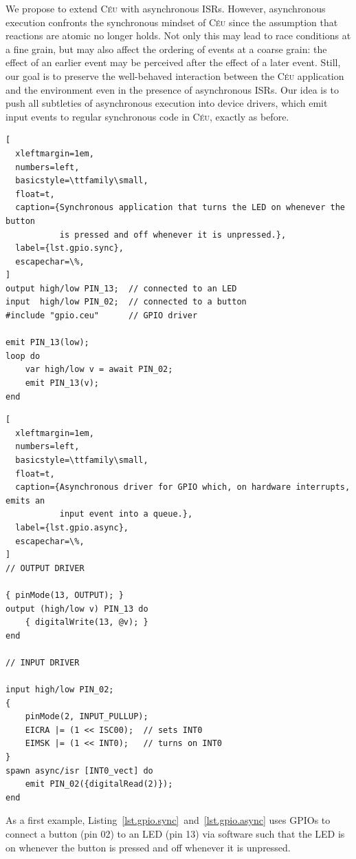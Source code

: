 \documentclass[sigplan,10pt,review,anonymous]{acmart}\settopmatter{printfolios=true,printccs=false,printacmref=false}
\newcommand{\CEU}{\textsc{C\'{e}u}\xspace}
\begin{document}
We propose to extend \CEU with asynchronous ISRs.
However, asynchronous execution confronts the synchronous mindset of \CEU since
the assumption that reactions are atomic no longer holds.
Not only this may lead to race conditions at a fine grain, but may also affect
the ordering of events at a coarse grain: the effect of an earlier event may be
perceived after the effect of a later event.
%
Still, our goal is to preserve the well-behaved interaction between the \CEU
application and the environment even in the presence of asynchronous ISRs.
%
Our idea is to push all subtleties of asynchronous execution into device
drivers, which emit input events to regular synchronous code in \CEU, exactly
as before.

\begin{lstlisting}[
  xleftmargin=1em,
  numbers=left,
  basicstyle=\ttfamily\small,
  float=t,
  caption={Synchronous application that turns the LED on whenever the button
           is pressed and off whenever it is unpressed.},
  label={lst.gpio.sync},
  escapechar=\%,
]
output high/low PIN_13;  // connected to an LED
input  high/low PIN_02;  // connected to a button
#include "gpio.ceu"      // GPIO driver

emit PIN_13(low);
loop do
    var high/low v = await PIN_02;
    emit PIN_13(v);
end
\end{lstlisting}

\begin{lstlisting}[
  xleftmargin=1em,
  numbers=left,
  basicstyle=\ttfamily\small,
  float=t,
  caption={Asynchronous driver for GPIO which, on hardware interrupts, emits an
           input event into a queue.},
  label={lst.gpio.async},
  escapechar=\%,
]
// OUTPUT DRIVER

{ pinMode(13, OUTPUT); }
output (high/low v) PIN_13 do
    { digitalWrite(13, @v); }
end

// INPUT DRIVER

input high/low PIN_02;
{
    pinMode(2, INPUT_PULLUP);
    EICRA |= (1 << ISC00);  // sets INT0
    EIMSK |= (1 << INT0);   // turns on INT0
}
spawn async/isr [INT0_vect] do
    emit PIN_02({digitalRead(2)});
end
\end{lstlisting}

As a first example, Listing~\ref{lst.gpio.sync}~and~\ref{lst.gpio.async} uses
GPIOs to connect a button (pin 02) to an LED (pin 13) via software such that
the LED is on whenever the button is pressed and off whenever it is unpressed.
\end{document}
